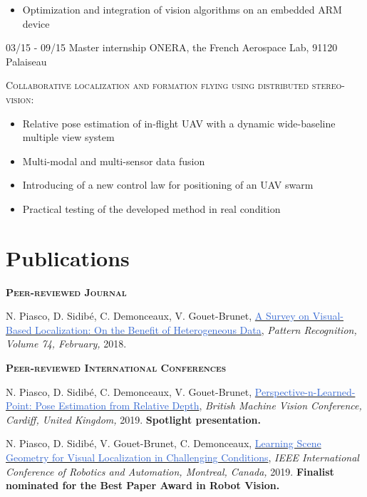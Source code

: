 \documentclass[]{friggeri-cv-cust}
\begin{document}
\begin{entrylist}
{\begin{itemize}[label=$\rhd$]
        \item Optimization and integration of vision algorithms on an embedded ARM device
    \end{itemize}\vspace{5pt}}
  \entry
    {03/15 - 09/15}
    {Master internship}
    {ONERA, the French Aerospace Lab, 91120 Palaiseau}
    {\textsc{Collaborative localization and formation ﬂying using distributed stereo-vision:}
    \begin{itemize}[label=$\rhd$]
    	\item Relative pose estimation of in-flight UAV with a dynamic wide-baseline multiple view system
    	\item Multi-modal and multi-sensor data fusion
        \item Introducing of a new control law for positioning of an UAV swarm 
        \item Practical testing of the developed method in real condition
    \end{itemize} \vspace{5pt}}
\end{entrylist}

\newpage
\section{Publications}
    \textsc{\textbf{Peer-reviewed Journal}}
    
    {\footnotesize{N. Piasco, D. Sidibé, C. Demonceaux, V. Gouet-Brunet, \href{http://recherche.ign.fr/labos/matis/pdf/articles_revues/2017/PSDG17.pdf}{\textcolor{highlight}{A Survey on Visual-Based Localization: On the Benefit of Heterogeneous Data}},
\textit{Pattern Recognition, Volume 74, February,} 2018.}}
	
	\vspace{0.5cm}
    \textsc{\textbf{Peer-reviewed International Conferences}}
   
    {\footnotesize{N. Piasco, D. Sidibé, C. Demonceaux, V. Gouet-Brunet, \href{https://hal.archives-ouvertes.fr/hal-02190840}{\textcolor{highlight}{Perspective-n-Learned-Point: Pose Estimation from Relative Depth}},
    \textit{British Machine Vision Conference, Cardiff, United Kingdom,} 2019. \textbf{Spotlight presentation.}}}
        
    
    {\footnotesize{N. Piasco, D. Sidibé, V. Gouet-Brunet, C. Demonceaux, \href{http://recherche.ign.fr/labos/matis/pdf/articles_conf/2019/root.pdf}{\textcolor{highlight}{Learning Scene Geometry for Visual Localization in Challenging Conditions}},
\textit{IEEE International Conference of Robotics and Automation, Montreal, Canada,} 2019. \textbf{Finalist nominated for the Best Paper Award in Robot Vision.}}}
\end{document}
